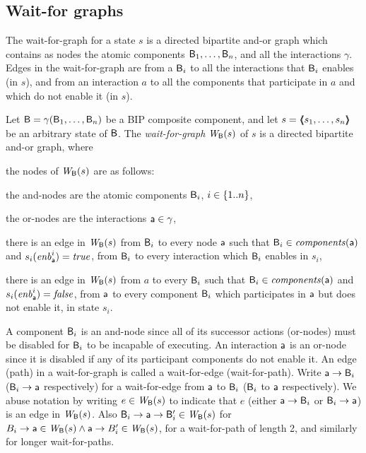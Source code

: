 \subsection{Wait-for graphs}
\label{secn:wait-for-graphs}

The wait-for-graph for a state $s$ is a directed bipartite and-or
graph which contains as nodes the atomic components $\mathsf{B}_1, \ldots,
\mathsf{B}_n$, and all the interactions $\gamma$.  Edges in the wait-for-graph
are from a $\mathsf{B}_i$ to all the interactions that $\mathsf{B}_i$ enables (in $s$),
and from an interaction $a$ to all the components that participate in
$a$ and which do not enable it (in $s$).


\label{def:static:wait-for-graph} 
\label{defn:static:wait-for-graph} 
Let $\mathsf{B} = \gamma(\mathsf{B}_1,\dots,\mathsf{B}_n)$ be a BIP composite component, and let
$s = \langle \hspace{-0.34em} \langle \hspace{-0.34em} \langle s_1,\ldots,s_n \rangle \hspace{-0.34em} \rangle \hspace{-0.34em} \rangle$ be an arbitrary state of $\mathsf{B}$.
The {\em wait-for-graph} $\mathit{W}_{\mathsf{B}}({s})$ of $s$ is a directed bipartite and-or graph, where
\begin{nlst1}

\item \label{def:static:wait-for-graph:nodes} the nodes of $\mathit{W}_{\mathsf{B}}({s})$ are as follows:
%
   \begin{nlst2}
   \item the and-nodes are the atomic components $\mathsf{B}_i$, $i \in \{ 1..n \}$,
   \item the or-nodes are the interactions $\mathsf{a} \in \gamma$,
   \end{nlst2}

\item \label{def:static:wait-for-graph:edges-aut-action} 
   there is an edge in $\mathit{W}_{\mathsf{B}}({s})$ from $\mathsf{B}_i$ to every node 
   $\mathsf{a}$ such that $\mathsf{B}_i \in \mathit{components}(\mathsf{a})$ and $s_i(\mathit{enb}_{\mathsf{a}}^{i}) = \mathit{true}$, \ie from $\mathsf{B}_i$ to every interaction
   which $\mathsf{B}_i$ enables in $s_i$,

\item  \label{def:static:wait-for-graph:edges-action-aut}
   there is an edge in $\mathit{W}_{\mathsf{B}}({s})$ from $a$ to every 
   $\mathsf{B}_i$ such that $\mathsf{B}_i \in \mathit{components}(\mathsf{a})$ and $s_i(\mathit{enb}_{\mathsf{a}}^{i}) = \mathit{false}$, \ie from $\mathsf{a}$ to every component
   $\mathsf{B}_i$ which participates in $\mathsf{a}$ but does not enable it, in state $s_i$.
                  
\end{nlst1}
\ed

A component $\mathsf{B}_i$ is an and-node since all of its successor actions (or-nodes) must be disabled for
$\mathsf{B}_i$ to be incapable of executing.  An interaction $\mathsf{a}$ is an or-node since it is disabled if
any of its participant components do not enable it.  An edge (path) in a wait-for-graph is called a
wait-for-edge (wait-for-path).  Write $\mathsf{a} \rightarrow \mathsf{B}_i$ ($\mathsf{B}_i \rightarrow \mathsf{a}$ respectively) for a
wait-for-edge from $\mathsf{a}$ to $\mathsf{B}_i$ ($\mathsf{B}_i$ to $\mathsf{a}$ respectively).  We abuse notation by writing
$e \in \mathit{W}_{\mathsf{B}}({s})$ to indicate that $e$ (either $\mathsf{a} \rightarrow \mathsf{B}_i$ or $\mathsf{B}_i \rightarrow \mathsf{a}$) is an edge in
$\mathit{W}_{\mathsf{B}}({s})$.  Also $\mathsf{B}_i \rightarrow \mathsf{a} \rightarrow \mathsf{B}'_i \in \mathit{W}_{\mathsf{B}}({s})$ for
$B_i \rightarrow \mathsf{a} \in \mathit{W}_{\mathsf{B}}({s}) \land \mathsf{a} \rightarrow B'_i \in \mathit{W}_{\mathsf{B}}({s})$, \ie for a wait-for-path of
length 2, and similarly for longer wait-for-paths.

